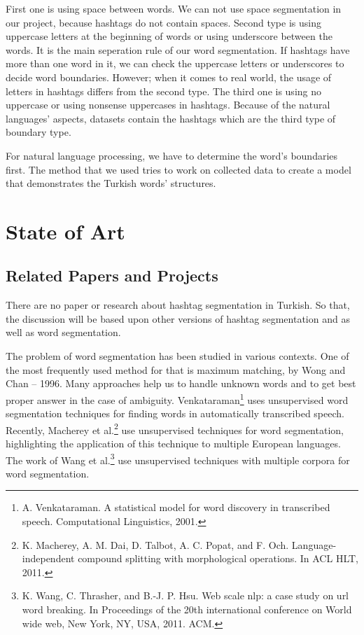 \documentclass[12pt]{comjnl}
\begin{document}
First one is using space between words. We can not use space segmentation in our project, because hashtags do not contain spaces. 
Second type is using uppercase letters at the beginning of words or using underscore between the words. It is the main seperation rule of our word segmentation. If hashtags have more than one word in it, we can check the uppercase letters or underscores to decide word boundaries. However; when it comes to real world, the usage of letters in hashtags differs from the second type.
The third one is using no uppercase or using nonsense uppercases in hashtags. Because of the natural languages' aspects, datasets contain the hashtags which are the third type of boundary type.

For natural language processing, we have to determine the word's boundaries first. The method that we used tries to work on collected data to create a model that demonstrates the Turkish words' structures.

\section{State of Art}
\subsection{Related Papers and Projects}
There are no paper or research about hashtag segmentation in Turkish. So that, the discussion will be based upon other versions of hashtag segmentation and as well as word segmentation.

The problem of word segmentation has been studied in
various contexts. 
One of the most frequently used method for that is maximum matching, by Wong and Chan – 1996. Many approaches help us to handle unknown words and to get best proper answer in the case of ambiguity.
Venkataraman\footnote{A. Venkataraman. A statistical model for word
discovery in transcribed speech. Computational Linguistics, 2001.} 
uses unsupervised word segmentation techniques for finding words in automatically
transcribed speech. Recently, Macherey et al.\footnote{ K. Macherey, A. M. Dai, D. Talbot, A. C. Popat, and
F. Och. Language-independent compound splitting with morphological operations. In ACL HLT, 2011.} 
use unsupervised techniques for word segmentation, highlighting
the application of this technique to multiple European languages.
The work of Wang et al.\footnote{K. Wang, C. Thrasher, and B.-J. P. Hsu. Web scale
nlp: a case study on url word breaking. In Proceedings of the 20th international conference on World wide web, New York, NY, USA, 2011. ACM.}
use unsupervised techniques with multiple corpora for word segmentation.
\end{document}
